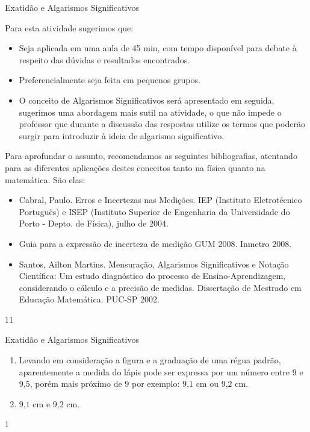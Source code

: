 \begin{sugestions}{Exatidão e Algarismos Significativos}
{
Para esta atividade sugerimos que:
\begin{itemize}
\item {} 
Seja aplicada em uma aula de 45 min, com tempo disponível para debate à respeito das dúvidas e resultados encontrados.

\item {} 
Preferencialmente seja feita em pequenos grupos.

\item {} 
O conceito de Algarismos Significativos será apresentado em seguida, sugerimos uma abordagem mais sutil na atividade, o que não impede o professor que durante a discussão das respostas utilize os termos que poderão surgir para introduzir à ideia de algarismo significativo.

\end{itemize}

Para aprofundar o assunto, recomendamos as seguintes bibliografias, atentando para as diferentes aplicações destes conceitos tanto na física quanto na matemática. São elas:
\begin{itemize}
\item {} 
Cabral, Paulo. Erros e Incertezas nas Medições. IEP (Instituto Eletrotécnico Português) e ISEP (Instituto Superior de Engenharia da Universidade do Porto - Depto. de Física), julho de 2004.

\item {} 
Guia para a expressão de incerteza de medição \textendash{} GUM 2008. Inmetro 2008.

\item {} 
Santos, Ailton Martins. Mensuração, Algarismos Significativos e Notação Científica: Um estudo diagnóstico do processo de Ensino-Aprendizagem, considerando o cálculo e a precisão de medidas. Dissertação de Mestrado em Educação Matemática. PUC-SP 2002.

\end{itemize}
}{1}{1}
\end{sugestions}
\begin{answer}{Exatidão e Algarismos Significativos}
{
\begin{enumerate}
\item Levando em consideração a figura e a graduação de uma régua padrão, aparentemente a medida do lápis pode ser expressa por um número entre \(9\) e \(9\text{,}5\), porém mais próximo de \(9\) por exemplo: \(9\text{,}1\) cm ou \(9\text{,}2\) cm.

\item {} 
\(9\text{,}1\) cm e \(9\text{,}2\) cm.
\end{enumerate}
}{1}
\end{answer}

